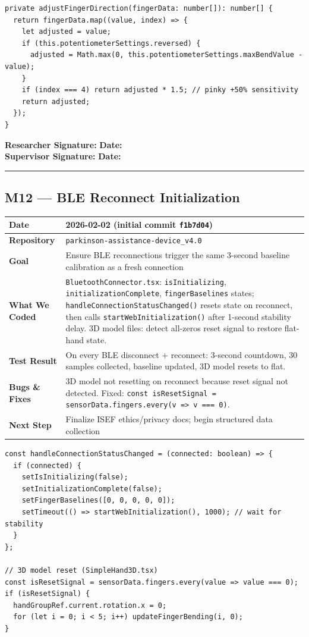 \documentclass[12pt,a4paper]{article}
\makeatletter
\newcommand{\sigblock}{%
  \vspace{0.6em}
  \noindent\textbf{Researcher Signature:} \underline{\hspace{6cm}} \quad \textbf{Date:} \underline{\hspace{3cm}}\\[0.4em]
  \noindent\textbf{Supervisor Signature:} \underline{\hspace{6cm}} \quad \textbf{Date:} \underline{\hspace{3cm}}
  \vspace{0.4em}\hrule\vspace{0.6em}
}
\newenvironment{milestonetable}{%
  \begin{tcolorbox}[colback=codebg, colframe=codeframe, breakable, left=4pt, right=4pt, top=4pt, bottom=4pt]
  \begin{tabularx}{\linewidth}{@{}>{\bfseries}p{3.2cm} X@{}}
  \toprule
}{%
  \bottomrule
  \end{tabularx}
  \end{tcolorbox}
}
\newcommand{\mrow}[2]{\midrule #1 & #2 \\}
\makeatother
\begin{document}
\begin{lstlisting}[style=tsstyle, caption={GlobalConnectionManager.ts -- Direction adjustment}]
private adjustFingerDirection(fingerData: number[]): number[] {
  return fingerData.map((value, index) => {
    let adjusted = value;
    if (this.potentiometerSettings.reversed) {
      adjusted = Math.max(0, this.potentiometerSettings.maxBendValue - value);
    }
    if (index === 4) return adjusted * 1.5; // pinky +50% sensitivity
    return adjusted;
  });
}
\end{lstlisting}

\sigblock

\subsection{M12 --- BLE Reconnect Initialization}

\begin{milestonetable}
\mrow{Date}{2026-02-02 (initial commit \texttt{f1b7d04})}
\mrow{Repository}{\texttt{parkinson-assistance-device\_v4.0}}
\mrow{Goal}{Ensure BLE reconnections trigger the same 3-second baseline calibration as a fresh connection}
\mrow{What We Coded}{\texttt{BluetoothConnector.tsx}: \texttt{isInitializing}, \texttt{initializationComplete}, \texttt{fingerBaselines} states; \texttt{handleConnectionStatusChanged()} resets state on reconnect, then calls \texttt{startWebInitialization()} after 1-second stability delay. 3D model files: detect all-zeros reset signal to restore flat-hand state.}
\mrow{Test Result}{On every BLE disconnect + reconnect: 3-second countdown, 30 samples collected, baseline updated, 3D model resets to flat.}
\mrow{Bugs \& Fixes}{3D model not resetting on reconnect because reset signal not detected. Fixed: \texttt{const isResetSignal = sensorData.fingers.every(v => v === 0)}.}
\mrow{Next Step}{Finalize ISEF ethics/privacy docs; begin structured data collection}
\end{milestonetable}

\begin{lstlisting}[style=tsstyle, caption={BluetoothConnector.tsx -- BLE reconnect handler}]
const handleConnectionStatusChanged = (connected: boolean) => {
  if (connected) {
    setIsInitializing(false);
    setInitializationComplete(false);
    setFingerBaselines([0, 0, 0, 0, 0]);
    setTimeout(() => startWebInitialization(), 1000); // wait for stability
  }
};

// 3D model reset (SimpleHand3D.tsx)
const isResetSignal = sensorData.fingers.every(value => value === 0);
if (isResetSignal) {
  handGroupRef.current.rotation.x = 0;
  for (let i = 0; i < 5; i++) updateFingerBending(i, 0);
}
\end{lstlisting}
\end{document}
